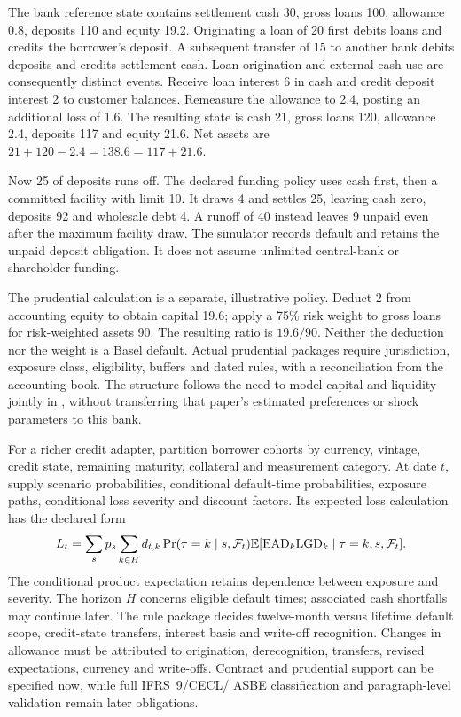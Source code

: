 The bank reference state contains settlement cash 30, gross loans 100,
allowance 0.8, deposits 110 and equity 19.2. Originating a loan of 20 first
debits loans and credits the borrower's deposit. A subsequent transfer of 15
to another bank debits deposits and credits settlement cash. Loan origination
and external cash use are consequently distinct events. Receive loan interest
6 in cash and credit deposit interest 2 to customer balances. Remeasure the
allowance to 2.4, posting an additional loss of 1.6. The resulting state is
cash 21, gross loans 120, allowance 2.4, deposits 117 and equity 21.6.
Net assets are $21+120-2.4=138.6=117+21.6$.

Now 25 of deposits runs off. The declared funding policy uses cash first,
then a committed facility with limit 10. It draws 4 and settles 25, leaving
cash zero, deposits 92 and wholesale debt 4. A runoff of 40 instead leaves
9 unpaid even after the maximum facility draw. The simulator records default
and retains the unpaid deposit obligation. It does not assume unlimited
central-bank or shareholder funding.

The prudential calculation is a separate, illustrative policy. Deduct 2 from
accounting equity to obtain capital 19.6; apply a 75\% risk weight to gross
loans for risk-weighted assets 90. The resulting ratio is $19.6/90$.
Neither the deduction nor the weight is a Basel default. Actual prudential
packages require jurisdiction, exposure class, eligibility, buffers and dated
rules, with a reconciliation from the accounting book. The structure follows
the need to model capital and liquidity jointly in
\citet[Section 2]{behn2019}, without transferring that paper's estimated
preferences or shock parameters to this bank.



For a richer credit adapter, partition borrower cohorts by currency, vintage,
credit state, remaining maturity, collateral and measurement category. At date
$t$, supply scenario probabilities, conditional default-time probabilities,
exposure paths, conditional loss severity and discount factors. Its expected
loss calculation has the declared form
\[
 L_t=\sum_s p_s\sum_{k\in H}
  d_{t,k}\Pr(\tau=k\mid s,\mathcal F_t)
  \mathbb{E}[\mathrm{EAD}_k\mathrm{LGD}_k\mid\tau=k,s,\mathcal F_t].
\]
The conditional product expectation retains dependence between exposure and
severity. The horizon $H$ concerns eligible default times; associated cash
shortfalls may continue later. The rule package decides twelve-month versus
lifetime default scope, credit-state transfers, interest basis and write-off
recognition. Changes in allowance must be attributed to origination,
derecognition, transfers, revised expectations, currency and write-offs.
Contract and prudential support can be specified now, while full IFRS~9/CECL/
ASBE classification and paragraph-level validation remain later obligations.


